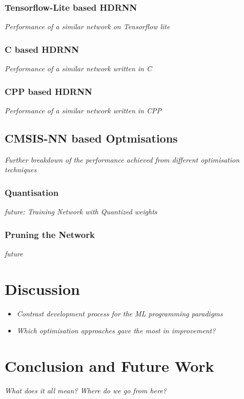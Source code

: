 \subsection[Tensorflow Lite]{Tensorflow-Lite based HDRNN}
\textit{Performance of a similar network on Tensorflow lite}

\subsection[C]{C based HDRNN}
\textit{Performance of a similar network written in C}

\subsection[CPP - Eigen]{CPP based HDRNN}
\textit{Performance of a similar network written in CPP}

\section{CMSIS-NN based Optmisations}
\textit{Further breakdown of the performance achieved from different optimisation techniques}

\subsection{Quantisation}
\textit{future: Training Network with Quantized weights}

\subsection{Pruning the Network}
\textit{future}

\chapter{Discussion}
\begin{itemize}
	\item \textit{Contrast development process for the ML programming paradigms}
	\item \textit{Which optimisation approaches gave the most in improvement?}
\end{itemize}

\chapter{Conclusion and Future Work}
\textit{What does it all mean? Where do we go from here?}
